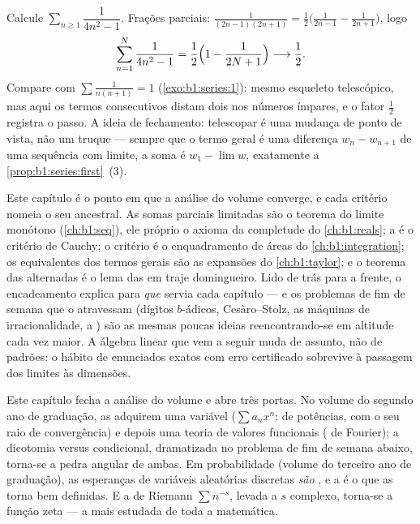 \begin{example}\label{ex:b1:series:oddtelescope}
Calcule $\sum_{n \geq 1} \dfrac{1}{4n^2 - 1}$. Frações
parciais: $\frac{1}{(2n-1)(2n+1)} =
\frac12\bigl(\frac{1}{2n-1} - \frac{1}{2n+1}\bigr)$, logo
\[
\sum_{n=1}^{N} \frac{1}{4n^2 - 1}
= \frac12\Bigl(1 - \frac{1}{2N+1}\Bigr)
\longrightarrow \frac12 .
\]
Compare com $\sum \frac{1}{n(n+1)} = 1$
(\cref{exo:b1:series:1}): mesmo esqueleto telescópico, mas aqui os
termos consecutivos distam dois nos números ímpares, e
o fator $\frac12$ registra o passo. A ideia de fechamento:
telescopar é uma mudança de ponto de vista, não um truque --- sempre
que o termo geral é uma diferença $w_n - w_{n+1}$ de uma sequência
com limite, a soma é $w_1 - \lim w$, exatamente a
\cref{prop:b1:series:first}~(3).
\end{example}

\begin{remark}
Este capítulo é o ponto em que a análise do volume converge, e cada
critério nomeia o seu ancestral. As somas parciais limitadas são o
teorema do limite monótono (\cref{ch:b1:seq}), ele próprio o axioma da
completude do \cref{ch:b1:reals}; a  é o critério de
Cauchy; o critério  é o enquadramento de áreas do \cref{ch:b1:integration};
os equivalentes dos termos gerais são as expansões do
\cref{ch:b1:taylor}; e o teorema das alternadas é o lema das  em traje domingueiro. Lido de trás para a frente, o
encadeamento explica para \emph{que} servia cada capítulo --- e os
problemas de fim de semana que o atravessam (dígitos $b$-ádicos,
Cesàro--Stolz, as máquinas de irracionalidade, a )
são as mesmas poucas ideias reencontrando-se em altitude cada vez
maior. A álgebra linear que vem a seguir muda de assunto, não de
padrões: o hábito de enunciados exatos com erro certificado
sobrevive à passagem dos limites às dimensões.
\end{remark}

\begin{remark}
Este capítulo fecha a análise do volume e abre três portas. No
volume do segundo ano de graduação, as  adquirem uma variável
($\sum
a_n x^n$:  de potências, com o seu raio de convergência) e
depois uma teoria de valores funcionais ( de Fourier); a
dicotomia  versus condicional, dramatizada no
problema de fim de semana abaixo, torna-se a pedra angular de
ambas. Em probabilidade (volume do terceiro ano de graduação), as
esperanças de variáveis aleatórias discretas \emph{são} , e a
 é o que as torna bem definidas. E a  de
Riemann $\sum n^{-s}$, levada a $s$ complexo, torna-se a função zeta --- a
 mais estudada de toda a matemática.
\end{remark}


